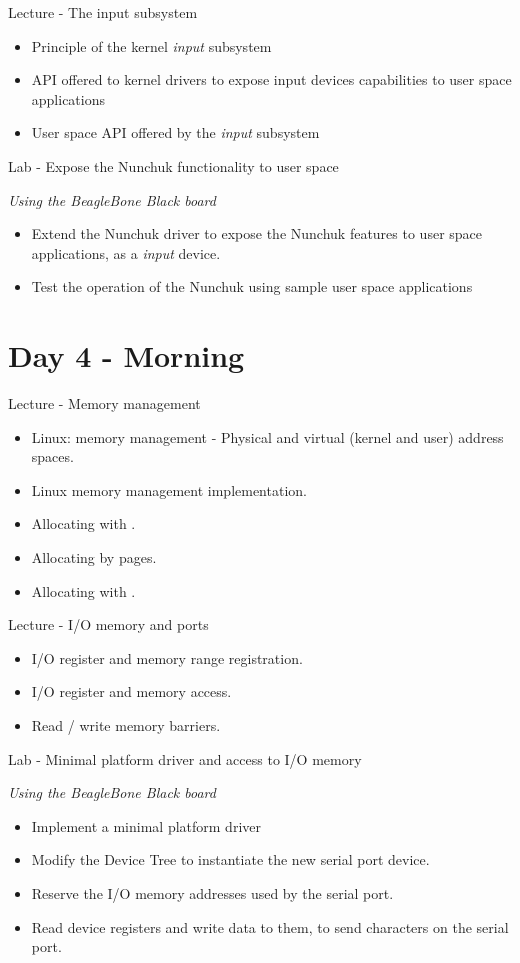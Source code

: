 \documentclass[a4paper,12pt,obeyspaces,spaces,hyphens]{article}
\begin{document}
\feagendatwocolumn
{Lecture - The input subsystem}
{
  \begin{itemize}
  \item Principle of the kernel {\em input} subsystem
  \item API offered to kernel drivers to expose input devices
    capabilities to user space applications
  \item User space API offered by the {\em input} subsystem
  \end{itemize}
}
{Lab - Expose the Nunchuk functionality to user space}
{
  {\em Using the BeagleBone Black board}
  \begin{itemize}
  \item Extend the Nunchuk driver to expose the Nunchuk features to
    user space applications, as a {\em input} device.
  \item Test the operation of the Nunchuk using sample user space
    applications
  \end{itemize}
}

\section{Day 4 - Morning}

\feagendatwocolumn
{Lecture - Memory management}
{
  \begin{itemize}
  \item Linux: memory management - Physical and virtual (kernel and user) address spaces.
  \item Linux memory management implementation.
  \item Allocating with .
  \item Allocating by pages.
  \item Allocating with .
  \end{itemize}
}
{Lecture - I/O memory and ports}
{
  \begin{itemize}
  \item I/O register and memory range registration.
  \item I/O register and memory access.
  \item Read / write memory barriers.
  \end{itemize}
}

\feagendaonecolumn
{Lab - Minimal platform driver and access to I/O memory}
{
  {\em Using the BeagleBone Black board}
  \begin{itemize}
  \item Implement a minimal platform driver
  \item Modify the Device Tree to instantiate the new serial port
    device.
  \item Reserve the I/O memory addresses used by the serial port.
  \item Read device registers and write data to them, to send
    characters on the serial port.
  \end{itemize}
}
\end{document}
